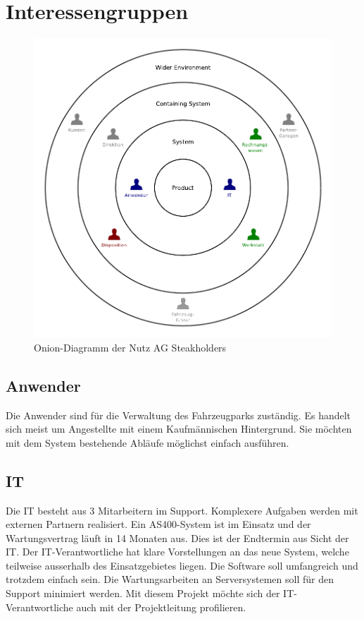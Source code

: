 \section{Interessengruppen}

\begin{center}
  \begin{figure}[ht]
    \includegraphics{graphics/onion.pdf}
    \caption{Onion-Diagramm der Nutz AG Steakholders}
    \label{fig:awesome_image}
  \end{figure}
\end{center}

\newpage
\subsection{Anwender}
Die Anwender sind für die Verwaltung des Fahrzeugparks zuständig. Es handelt sich meist um Angestellte mit einem Kaufmännischen Hintergrund. Sie möchten mit dem System bestehende Abläufe möglichst einfach ausführen. 


\subsection{IT}
Die IT besteht aus 3 Mitarbeitern im Support. Komplexere Aufgaben werden mit externen Partnern realisiert. Ein AS400-System ist im Einsatz und der Wartungsvertrag läuft in 14 Monaten aus. Dies ist der Endtermin aus Sicht der IT. Der IT-Verantwortliche hat klare Vorstellungen an das neue System, welche teilweise ausserhalb des Einsatzgebietes liegen. Die Software soll umfangreich und trotzdem einfach sein. Die Wartungsarbeiten an Serversystemen soll für den Support minimiert werden. Mit diesem Projekt möchte sich der IT-Verantwortliche auch mit der Projektleitung profilieren.

